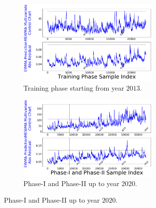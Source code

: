 \documentclass[twoside,11pt]{article}
\begin{document}
\begin{figure}[!htbp]
\begin{subfigure}[t]{0.48\linewidth}
     \centering
     \begin{subfigure}[t]{\linewidth}
     \centering
        \includegraphics[width=\textwidth, trim=.0in .0in .0in .0in, clip]{../figures/v14/bike_sharing/reg_lin_cat_syr_13_tr_5/train_bike_reg_1e-08_0_0001_0_01_99_99.png}
        \caption{Training phase starting from year $2013$.}
     \end{subfigure}
     \begin{subfigure}[t]{\linewidth}
     \centering
        \includegraphics[width=\textwidth, trim=.0in .0in .0in .0in, clip]{../figures/v14/bike_sharing/reg_lin_cat_syr_13_tr_5/bike_reg_1e-08_0_0001_0_01_99_99.png}
        \caption{Phase-I and Phase-II up to year $2020$.}
     \end{subfigure}
     \label{fig:bs_tr_2013}
\end{subfigure}
\caption{
}
\end{figure}
\end{document}
